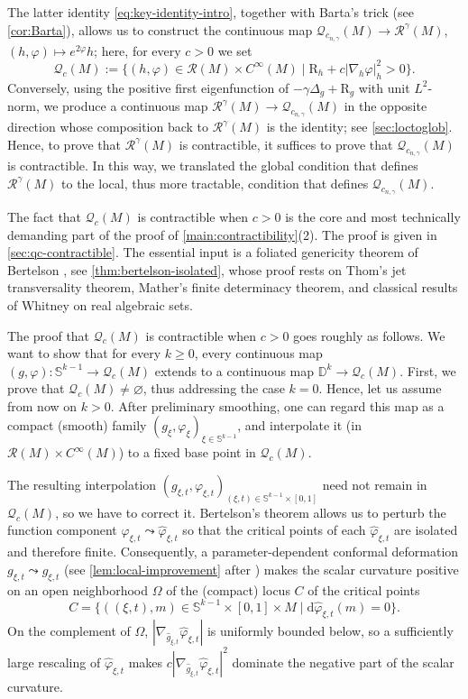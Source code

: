 \documentclass[11pt]{amsart}
\numberwithin{equation}{section}
\newcommand{\scal}{\mathrm{R}}
\let\geq\geqslant
\begin{document}
The latter identity \eqref{eq:key-identity-intro}, together with Barta's trick (see \cref{cor:Barta}), allows us to construct the continuous map $\mathcal Q_{c_{n,\gamma}}(M)\to \mathcal R^\gamma(M)$, $(h,\varphi)\mapsto e^{2\varphi}h$; here, for every $c>0$ we set
\[
\mathcal Q_c(M):=
\bigl\{(h,\varphi)\in\mathcal R(M)\times C^\infty(M)\mid
\scal_h+c|\nabla_h\varphi|_h^2>0\bigr\}.
\]
Conversely, using the positive first eigenfunction of $-\gamma\Delta_g+\scal_g$ with unit $L^2$-norm, we produce a continuous map $\mathcal{R}^\gamma(M)\to \mathcal{Q}_{c_{n,\gamma}}(M)$ in the opposite direction whose composition back to $\mathcal R^\gamma(M)$ is the identity; see \cref{sec:loctoglob}. Hence, to prove that $\mathcal{R}^\gamma(M)$ is contractible, it suffices to prove that $\mathcal Q_{c_{n,\gamma}}(M)$ is contractible. In this way, we translated the global condition that defines $\mathcal{R}^\gamma(M)$ to the local, thus more tractable, condition that defines $\mathcal Q_{c_{n,\gamma}}(M)$.
\smallskip

The fact that $\mathcal{Q}_c(M)$ is contractible when $c>0$ is the core and most technically demanding part of the proof of \cref{main:contractibility}(2). The proof is given in \cref{sec:qc-contractible}. The essential  input is a foliated genericity theorem of Bertelson \cite[Proposition~3.21]{Bertelson2002}, see \cref{thm:bertelson-isolated}, whose proof rests on Thom's jet transversality theorem, Mather's finite determinacy theorem, and classical results of Whitney on real algebraic sets. 

The proof that $\mathcal{Q}_c(M)$ is contractible when $c>0$ goes roughly as follows. We want to show that for every $k\geq 0$, every continuous map $(g,\varphi):\mathbb S^{k-1}\to\mathcal Q_c(M)$ extends to a continuous map $\mathbb D^k\to \mathcal Q_c(M)$. 
First, we prove that $\mathcal Q_c(M)\neq\varnothing$, thus addressing the case $k=0$. 
Hence, let us assume from now on $k>0$. 
After preliminary smoothing, one can regard this map as a compact (smooth) family $(g_\xi,\varphi_\xi)_{\xi\in\mathbb S^{k-1}}$, and interpolate it (in $\mathcal{R}(M)\times C^\infty(M)$) to a fixed base point in $\mathcal{Q}_c(M)$. 

The resulting interpolation $(g_{\xi,t},\varphi_{\xi,t})_{(\xi,t)\in\mathbb S^{k-1}\times[0,1]}$ need not remain in $\mathcal Q_c(M)$, so we have to correct it. 
Bertelson’s theorem allows us to perturb the function component $\varphi_{\xi,t}\leadsto \widehat \varphi_{\xi,t}$ so that the critical points of each $\widehat\varphi_{\xi,t}$ are isolated and therefore finite. 
Consequently, a parameter-dependent conformal deformation $g_{\xi,t}\leadsto \widehat g_{\xi,t}$ (see \cref{lem:local-improvement} after \cite{BaerHankeLocalFlexibility}) makes the scalar curvature positive on an open neighborhood $\Omega$ of the (compact) locus $C$ of the critical points
\[
 C=\{((\xi,t),m)\in \mathbb S^{k-1}\times[0,1]\times M\mid\mathrm{d}\widehat\varphi_{\xi,t}(m)=0\}.
\]
On the complement of $\Omega$, $|\nabla_{\widehat g_{\xi,t}}\widehat\varphi_{\xi,t}|$ is uniformly bounded below, so a sufficiently large rescaling of $\widehat\varphi_{\xi,t}$ makes $c|\nabla_{\widehat g_{\xi,t}}\widehat\varphi_{\xi,t}|^2$ dominate the negative part of the scalar curvature. 
\end{document}
